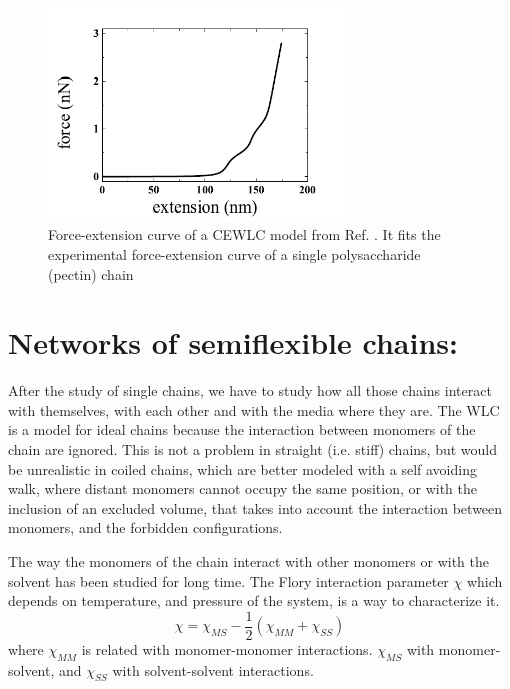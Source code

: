 \begin{figure}[ht]
\begin{center}
\includegraphics[width=0.7\textwidth,height=0.5\textwidth]{Figures/chapter-intro/forceextension_CEWLC.png}%

\caption[Force extension curve: CEWLC]{Force-extension curve of a CEWLC model
from Ref. \citep{schuster_hierarchical_2011}. It fits the experimental
force-extension curve of a single polysaccharide (pectin) chain \citep{haverkamp_model_2007} }
\label{fig:force_extension_CEWLC}
\end{center}
\end{figure}

\section{Networks of semiflexible chains:}
After the study of single chains, we have to study how all those chains interact
with themselves, with each other and with the media where they are.
The WLC is a model for ideal chains because the interaction between
monomers of the chain are ignored. This is not a problem in straight
(i.e. stiff) chains, but would be unrealistic in coiled chains, which are better
modeled with a self avoiding walk, where distant monomers cannot occupy the
same position, or with the inclusion of an excluded volume, that takes into
account the interaction between monomers, and the forbidden configurations.

The way the monomers of the chain interact with other monomers or with the
solvent has been studied for long time. The Flory interaction parameter $\chi$
which depends on temperature, and pressure of the system, is a way to
characterize it.
\begin{equation}\label{FloryInteraction}
\chi=\chi_{MS} - \frac{1}{2}(\chi_{MM} + \chi_{SS})
\end{equation}
where  $\chi_{MM}$ is related with monomer-monomer interactions. $\chi_{MS}$
with monomer-solvent, and $\chi_{SS}$ with solvent-solvent
interactions.

